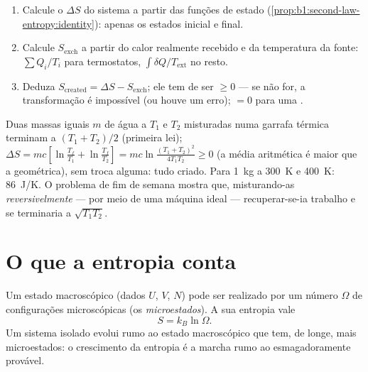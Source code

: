 \begin{method}\label{met:b1:second-law-entropy:method}
\begin{enumerate}
  \item Calcule o $\Delta S$ do sistema a partir das funções de estado
        (\cref{prop:b1:second-law-entropy:identity}): apenas os estados
        inicial e final.
  \item Calcule $S_{\mathrm{exch}}$ a partir do calor realmente recebido e da
        temperatura da fonte: $\sum Q_i/T_i$ para termostatos,
        $\int\delta Q/T_{\mathrm{ext}}$ no resto.
  \item Deduza $S_{\mathrm{created}} = \Delta S - S_{\mathrm{exch}}$; ele tem de ser
        $\geq 0$ --- se não for, a transformação é impossível (ou houve um
        erro); $= 0$ para uma .
\end{enumerate}
\end{method}

\begin{example}\label{ex:b1:second-law-entropy:mixing}
Duas massas iguais $m$ de água a $T_1$ e $T_2$ misturadas numa garrafa térmica terminam a
$(T_1 + T_2)/2$ (primeira lei); $\Delta S = mc[\ln\frac{T_f}{T_1} + \ln\frac{T_f}{T_2}]
= mc\ln\frac{(T_1 + T_2)^2}{4T_1T_2} \geq 0$ (a média aritmética é maior que a
geométrica), sem troca alguma: tudo criado. Para \qty{1}{kg} a \qty{300}{K} e
\qty{400}{K}: \qty{86}{J/K}. O problema de fim de semana mostra que,
misturando-as \emph{reversivelmente} --- por meio de uma máquina ideal ---
recuperar-se-ia trabalho e se terminaria a $\sqrt{T_1T_2}$.
\end{example}

\section{O que a entropia conta}

\begin{proposition}\label{prop:b1:second-law-entropy:boltzmann}
Um estado macroscópico (dados $U$, $V$, $N$) pode ser realizado por um número
$\Omega$ de configurações microscópicas (os \emph{microestados}). A sua entropia vale
\[
S = k_B\ln\Omega .
\]
Um sistema isolado evolui rumo ao estado macroscópico que tem, de longe,
mais microestados: o crescimento da entropia é a marcha rumo ao
esmagadoramente provável.
\end{proposition}
\admitted

